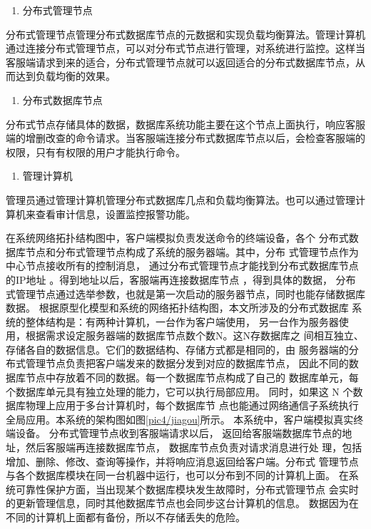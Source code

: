 	\begin{enumerate}[resume]
		\item 分布式管理节点
	\end{enumerate}

	分布式管理节点管理分布式数据库节点的元数据和实现负载均衡算法。管理计算机通过连接分布式管理节点，可以对分布式节点进行管理，对系统进行监控。这样当客服端请求到来的适合，分布式管理节点就可以返回适合的分布式数据库节点，从而达到负载均衡的效果。

	\begin{enumerate}[resume]
		\item 分布式数据库节点
	\end{enumerate}

	分布式节点存储具体的数据，数据库系统功能主要在这个节点上面执行，响应客服端的增删改查的命令请求。当客服端连接分布式数据库节点以后，会检查客服端的权限，只有有权限的用户才能执行命令。

	\begin{enumerate}[resume]
		\item 管理计算机
	\end{enumerate}

	管理员通过管理计算机管理分布式数据库几点和负载均衡算法。也可以通过管理计算机来查看审计信息，设置监控报警功能。


在系统网络拓扑结构图中，客户端模拟负责发送命令的终端设备，各个
分布式数据库节点和分布式管理节点构成了系统的服务器端。其中，分布
式管理节点作为中心节点接收所有的控制消息，
通过分布式管理节点才能找到分布式数据库节点的IP地址
。得到地址以后，客服端再连接数据库节点
，得到具体的数据，
分布式管理节点通过选举参数，也就是第一次启动的服务器节点，同时也能存储数据库数据。
根据原型化模型和系统的网络拓扑结构图，本文所涉及的分布式数据库
系统的整体结构是：有两种计算机，一台作为客户端使用，
另一台作为服务器使
用，根据需求设定服务器端的数据库节点数个数N。这N存数据库之
间相互独立、存储各自的数据信息。它们的数据结构、存储方式都是相同的，由
服务器端的分布式管理节点负责把客户端发来的数据分发到对应的数据库节点，
因此不同的数据库节点中存放着不同的数据。每一个数据库节点构成了自己的
数据库单元，每个数据库单元具有独立处理的能力，它可以执行局部应用。
同时，如果这 N 个数据库物理上应用于多台计算机时，每个数据库节
点也能通过网络通信子系统执行全局应用。本系统的架构图如图\ref{pic4/jiagou}所示。
本系统中，客户端模拟真实终端设备。
分布式管理节点收到客服端请求以后，
返回给客服端数据库节点的地址，然后客服端再连接数据库节点，
数据库节点负责对请求消息进行处
理，包括增加、删除、修改、查询等操作，并将响应消息返回给客户端。分布式
管理节点与各个数据库模块在同一台机器中运行，也可以分布到不同的计算机上面。
在系统可靠性保护方面，当出现某个数据库模块发生故障时，分布式管理节点
会实时的更新管理信息，同时其他数据库节点也会同步这台计算机的信息。
数据因为在不同的计算机上面都有备份，所以不存储丢失的危险。
